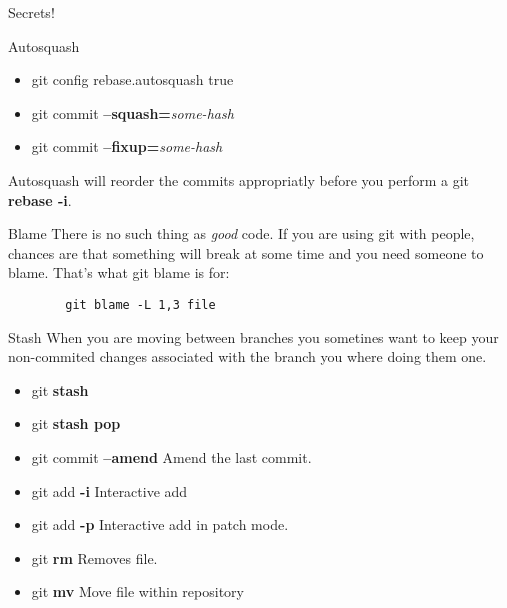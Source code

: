 \documentclass{beamer}
\begin{document}
\begin{frame}{Secrets!}
  \begin{block}{Autosquash}
    \begin{itemize}
      \item git config rebase.autosquash true
      \item git commit \textbf{--squash=}\emph{some-hash}
      \item git commit \textbf{--fixup=}\emph{some-hash}
     \end{itemize}
     Autosquash will reorder the commits appropriatly before you perform a git \textbf{rebase -i}.
  \end{block}
  \begin{block}{Blame}
    There is no such thing as \textit{good} code. If you are using git with people, chances are that something will break at some time and you need someone to blame. That's what git blame is for:
    \begin{lstlisting}
        git blame -L 1,3 file
    \end{lstlisting}
  \end{block}
  \framebreak
  \begin{block}{Stash}
    When you are moving between branches you sometines want to keep your non-commited changes associated with the branch you where doing them one.
    \begin{itemize}
      \item git \textbf{stash}
      \item git \textbf{stash pop}
    \end{itemize}
  \end{block}

  \begin{itemize}
    \item git commit \textbf{--amend} Amend the last commit.
    \item git add \textbf{-i} Interactive add
    \item git add \textbf{-p} Interactive add in patch mode.
    \item git \textbf{rm} Removes file.
    \item git \textbf{mv} Move file within repository
  \end{itemize}
\end{frame}
\end{document}
